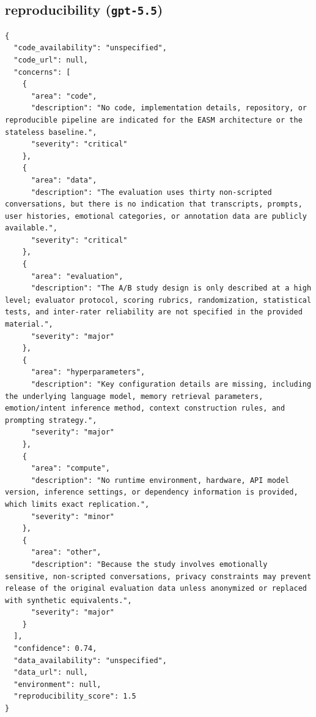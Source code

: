 \documentclass[11pt]{article}
\begin{document}
\subsection*{reproducibility (\texttt{gpt-5.5})}
\begin{verbatim}
{
  "code_availability": "unspecified",
  "code_url": null,
  "concerns": [
    {
      "area": "code",
      "description": "No code, implementation details, repository, or reproducible pipeline are indicated for the EASM architecture or the stateless baseline.",
      "severity": "critical"
    },
    {
      "area": "data",
      "description": "The evaluation uses thirty non-scripted conversations, but there is no indication that transcripts, prompts, user histories, emotional categories, or annotation data are publicly available.",
      "severity": "critical"
    },
    {
      "area": "evaluation",
      "description": "The A/B study design is only described at a high level; evaluator protocol, scoring rubrics, randomization, statistical tests, and inter-rater reliability are not specified in the provided material.",
      "severity": "major"
    },
    {
      "area": "hyperparameters",
      "description": "Key configuration details are missing, including the underlying language model, memory retrieval parameters, emotion/intent inference method, context construction rules, and prompting strategy.",
      "severity": "major"
    },
    {
      "area": "compute",
      "description": "No runtime environment, hardware, API model version, inference settings, or dependency information is provided, which limits exact replication.",
      "severity": "minor"
    },
    {
      "area": "other",
      "description": "Because the study involves emotionally sensitive, non-scripted conversations, privacy constraints may prevent release of the original evaluation data unless anonymized or replaced with synthetic equivalents.",
      "severity": "major"
    }
  ],
  "confidence": 0.74,
  "data_availability": "unspecified",
  "data_url": null,
  "environment": null,
  "reproducibility_score": 1.5
}
\end{verbatim}
\end{document}
